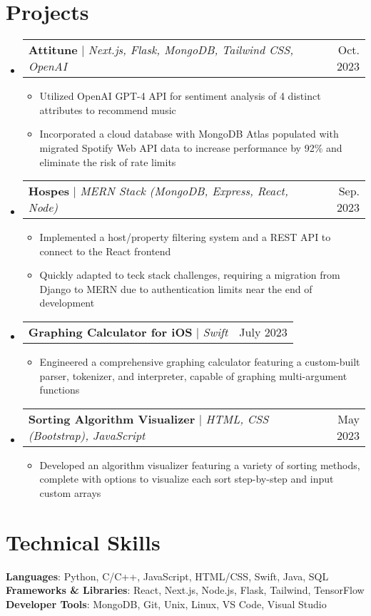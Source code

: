 \documentclass[letterpaper,12pt]{article}
\makeatletter
\newcommand{\resumeItem}[1]{
  \item\small{
    {#1 \vspace{-2pt}}
  }
}
\newcommand{\resumeProjectHeading}[2]{
    \item
    \begin{tabular*}{0.97\textwidth}{l@{\extracolsep{\fill}}r}
      \small#1 & #2 \\
    \end{tabular*}\vspace{-7pt}
}
\newcommand{\resumeSubHeadingListStart}{\begin{itemize}[leftmargin=0.15in, label={}]}
\newcommand{\resumeSubHeadingListEnd}{\end{itemize}}
\newcommand{\resumeItemListStart}{\begin{itemize}}
\newcommand{\resumeItemListEnd}{\end{itemize}\vspace{-5pt}}
\makeatother
\begin{document}
\section{Projects}
    \resumeSubHeadingListStart
      \resumeProjectHeading
          {\textbf{Attitune} $|$ \emph{Next.js, Flask, MongoDB, Tailwind CSS, OpenAI}}{Oct. 2023}
          \resumeItemListStart
            \resumeItem{Utilized OpenAI GPT-4 API for sentiment analysis of 4 distinct attributes to recommend
            music}
            \resumeItem{Incorporated a cloud database with MongoDB Atlas populated with migrated Spotify Web API data to increase performance by 92\% and eliminate the risk of rate limits}
          \resumeItemListEnd
      \resumeProjectHeading
          {\textbf{Hospes} $|$ \emph{MERN Stack (MongoDB, Express, React, Node)}}{Sep. 2023}
          \resumeItemListStart
            \resumeItem{Implemented a host/property filtering system and a REST API to connect to the React frontend}
            \resumeItem{Quickly adapted to teck stack challenges, requiring a migration from Django to MERN due to authentication limits near the end of development}
          \resumeItemListEnd
      \resumeProjectHeading
          {\textbf{Graphing Calculator for iOS} $|$ \emph{Swift}}{July 2023}
          \resumeItemListStart
            \resumeItem{Engineered a comprehensive graphing calculator featuring a custom-built parser, tokenizer, and interpreter, capable of graphing multi-argument functions}
          \resumeItemListEnd
      \resumeProjectHeading
          {\textbf{Sorting Algorithm Visualizer} $|$ \emph{HTML, CSS (Bootstrap), JavaScript}}{May 2023}
          \resumeItemListStart
            \resumeItem{Developed an algorithm visualizer featuring a variety of sorting methods, complete with options to visualize each sort step-by-step and input custom arrays}
          \resumeItemListEnd
    \resumeSubHeadingListEnd


\section{Technical Skills}
 \begin{itemize}[leftmargin=0.15in, label={}]
    \small{\item{
     \textbf{Languages}{: Python, C/C++, JavaScript, HTML/CSS, Swift, Java, SQL} \\
     \textbf{Frameworks \& Libraries}{: React, Next.js, Node.js, Flask, Tailwind, TensorFlow} \\
     \textbf{Developer Tools}{: MongoDB, Git, Unix, Linux, VS Code, Visual Studio} \\
    }}
 \end{itemize}
\end{document}
